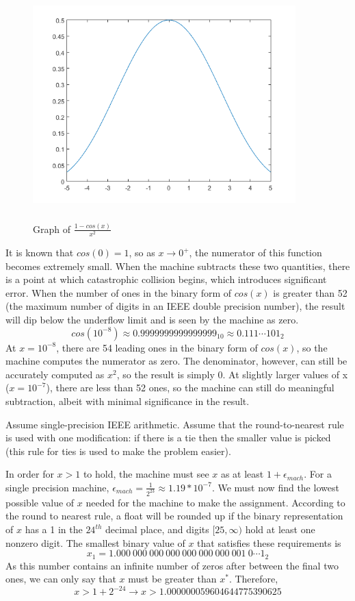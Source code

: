 	\begin{figure}[h!]
		\centering
		\includegraphics[width=4in, height=3.5in]{holmes1_12.png}
		\caption{Graph of $\frac{1-cos(x)}{x^2} $}
		\label{fig:graph333}
	\end{figure}

	It is known that $cos(0) = 1$, so as $x \rightarrow 0^+$, the numerator of this function becomes extremely small. When the machine
	subtracts these two quantities, there is a point at which catastrophic collision begins, which introduces significant error. When the
	number of ones in the binary form of $cos(x)$ is greater than 52 (the maximum number of digits in an IEEE double precision number),
	the result will dip below the underflow limit and is seen by the machine as zero.
	$$cos(10^{-8}) \approx 0.9999999999999999_{10} \approx 0.111\cdots101_2$$
	At $x=10^{-8}$, there are 54 leading ones in the binary form of $cos(x)$, so the machine computes the numerator as zero. The
	denominator, however, can still be accurately computed as $x^2$, so the result is simply 0.
	At slightly
	larger values of x ($x=10^{-7}$), there are less than 52 ones, so the machine can still do meaningful subtraction, albeit with minimal
	significance in the result.

\item
Assume single-precision IEEE arithmetic. Assume that the round-to-nearest rule is used with one modification: if there is a tie then the smaller value is picked (this rule for ties is used to make the problem easier).
\benum
\item
	In order for $x>1$ to hold, the machine must see $x$ as at least $1+\epsilon_{mach}$. For a single precision machine, $\epsilon_{mach}
	=\frac{1}{2^{23}} \approx 1.19*10^{-7}$. We must now find the lowest possible value of $x$ needed for the machine to make the
	assignment. According to the round to nearest rule, a float will be rounded up if the binary representation of $x$ has a 1 in the
	$24^{th}$ decimal place, and digits $[25, \infty)$ hold at least one nonzero digit. The smallest binary value of $x$ that satisfies
	these requirements is $$x_1 = 1.000\ 000\ 000\ 000\ 000\ 000\ 000\ 001\ 0\cdots1_2$$
	As this number contains an infinite number of zeros after between the final two ones, we can only say that $x$ must be greater
	than $x^*$. Therefore,
	$$x>1+2^{-24} \rightarrow x>1.000000059604644775390625$$\\

